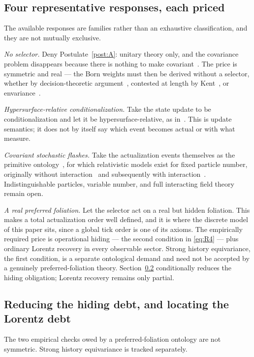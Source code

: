 \documentclass[11pt,a4paper]{article}
\theoremstyle{definition}
\theoremstyle{plain}
\theoremstyle{remark}
\begin{document}
\subsection{Four representative responses, each priced}

\label{sec:responses}
The available responses are families rather than an exhaustive
classification, and they are not mutually exclusive.

\emph{No selector.} Deny Postulate~\ref{post:A}: unitary theory only, and
the covariance problem disappears because there is nothing to make
covariant~\cite{everett}. The price is symmetric and real --- the Born
weights must then be derived without a selector, whether by
decision-theoretic argument~\cite{deutsch,wallace}, contested at length
by Kent~\cite{kent}, or envariance~\cite{zurek}.

\emph{Hypersurface-relative conditionalization.} Take the state update to
be conditionalization and let it be hypersurface-relative, as
in~\cite{aharonovalbert,myrvold}. This is update semantics; it does not
by itself say which event becomes actual or with what measure.

\emph{Covariant stochastic flashes.} Take the actualization events
themselves as the primitive ontology~\cite{bell}, for which
relativistic models exist for fixed particle number, originally without
interaction~\cite{tumulka06} and subsequently with
interaction~\cite{tumulka20}. Indistinguishable particles, variable
number, and full interacting field theory remain open.

\emph{A real preferred foliation.} Let the selector act on a real but
hidden foliation. This makes a total actualization order well defined,
and it is where the discrete model of this paper sits, since a global
tick order is one of its axioms. The empirically required price is
operational hiding --- the second condition in \eqref{eq:R4} --- plus
ordinary Lorentz recovery in every observable sector. Strong history
equivariance, the first condition, is a separate ontological demand and
need not be accepted by a genuinely preferred-foliation theory.
Section~\ref{sec:proofs} conditionally reduces the hiding obligation;
Lorentz recovery remains only partial.

\subsection{Reducing the hiding debt, and locating the Lorentz debt}
\label{sec:proofs}

The two empirical checks owed by a preferred-foliation ontology are not
symmetric. Strong history equivariance is tracked separately.
\end{document}
